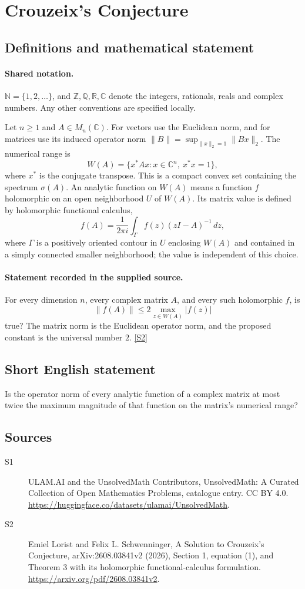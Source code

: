 \documentclass[11pt]{article}
\newcommand{\sref}[2]{\hyperlink{source:#1:#2}{[S#2]}}
\begin{document}
\section{Crouzeix's Conjecture}\label{statement}

\subsection{Definitions and mathematical statement}

\paragraph{Shared notation.}$\mathbb N=\{1,2,\ldots\}$, and $\mathbb Z,\mathbb Q,\mathbb R,\mathbb C$ denote the integers, rationals, reals and complex numbers. Any other conventions are specified locally.


Let $n\ge1$ and $A\in M_n(\mathbb C)$. For vectors use the Euclidean norm, and for matrices use its induced operator norm $\|B\|=\sup_{\|x\|_2=1}\|Bx\|_2$. The numerical range is
\[
 W(A)=\{x^*Ax:x\in\mathbb C^n,\ x^*x=1\},
\]
where $x^*$ is the conjugate transpose. This is a compact convex set containing the spectrum $\sigma(A)$. An analytic function on $W(A)$ means a function $f$ holomorphic on an open neighborhood $U$ of $W(A)$. Its matrix value is defined by holomorphic functional calculus,
\[
 f(A)=\frac1{2\pi i}\int_\Gamma f(z)(zI-A)^{-1}\,dz,
\]
where $\Gamma$ is a positively oriented contour in $U$ enclosing $W(A)$ and contained in a simply connected smaller neighborhood; the value is independent of this choice.
\paragraph{Statement recorded in the supplied source.}
For every dimension $n$, every complex matrix $A$, and every such holomorphic $f$, is
\[
 \|f(A)\|\le2\max_{z\in W(A)}|f(z)|
\]
true? The matrix norm is the Euclidean operator norm, and the proposed constant is the universal number $2$. \sref{statement}{2}
\subsection{Short English statement}
Is the operator norm of every analytic function of a complex matrix at most twice the maximum magnitude of that function on the matrix’s numerical range?
\subsection{Sources}
\begin{description}
\item[\hypertarget{source:statement:1}{S1}] ULAM.AI and the UnsolvedMath Contributors, UnsolvedMath: A Curated Collection of Open Mathematics Problems, catalogue entry. CC BY 4.0. \url{https://huggingface.co/datasets/ulamai/UnsolvedMath}.
\item[\hypertarget{source:statement:2}{S2}] Emiel Lorist and Felix L. Schwenninger, A Solution to Crouzeix’s Conjecture, arXiv:2608.03841v2 (2026), Section 1, equation (1), and Theorem 3 with its holomorphic functional-calculus formulation. \url{https://arxiv.org/pdf/2608.03841v2}.
\end{description}
\label{end:statement}
\end{document}
